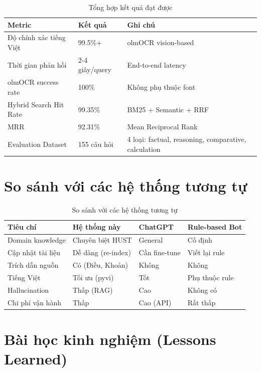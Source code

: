 \documentclass[../DoAn.tex]{subfiles}
\begin{document}
\begin{table}[h]
\centering
\begin{tabular}{|l|l|l|}
\hline
\textbf{Metric} & \textbf{Kết quả} & \textbf{Ghi chú} \\
\hline
Độ chính xác tiếng Việt & 99.5\%+ & olmOCR vision-based \\
\hline
Thời gian phản hồi & 2-4 giây/query & End-to-end latency \\
\hline
olmOCR success rate & 100\% & Không phụ thuộc font \\
\hline
Hybrid Search Hit Rate & 99.35\% & BM25 + Semantic + RRF \\
\hline
MRR & 92.31\% & Mean Reciprocal Rank \\
\hline
Evaluation Dataset & 155 câu hỏi & 4 loại: factual, reasoning, comparative, calculation \\
\hline
\end{tabular}
\caption{Tổng hợp kết quả đạt được}
\end{table}

\section{So sánh với các hệ thống tương tự}

\begin{table}[h]
\centering
\begin{tabular}{|l|l|l|l|}
\hline
\textbf{Tiêu chí} & \textbf{Hệ thống này} & \textbf{ChatGPT} & \textbf{Rule-based Bot} \\
\hline
Domain knowledge & Chuyên biệt HUST & General & Cố định \\
\hline
Cập nhật tài liệu & Dễ dàng (re-index) & Cần fine-tune & Viết lại rule \\
\hline
Trích dẫn nguồn & Có (Điều, Khoản) & Không & Không \\
\hline
Tiếng Việt & Tối ưu (pyvi) & Tốt & Phụ thuộc rule \\
\hline
Hallucination & Thấp (RAG) & Cao & Không có \\
\hline
Chi phí vận hành & Thấp & Cao (API) & Rất thấp \\
\hline
\end{tabular}
\caption{So sánh với các hệ thống tương tự}
\end{table}

\section{Bài học kinh nghiệm (Lessons Learned)}
\end{document}
